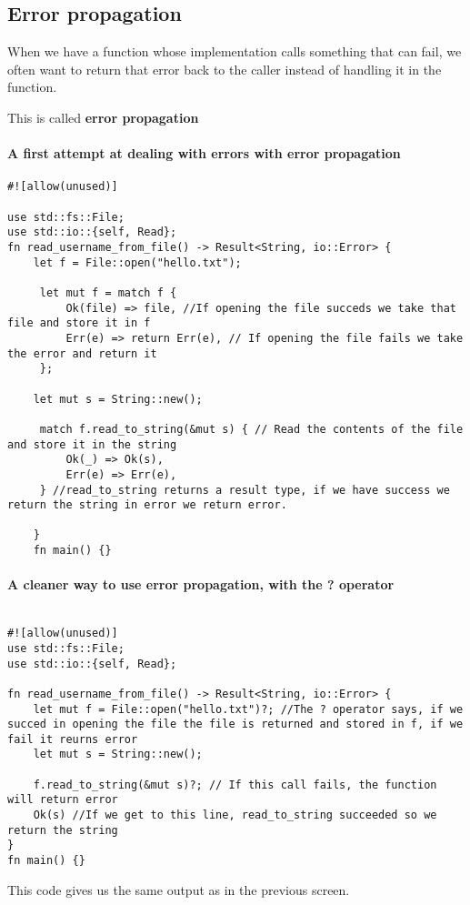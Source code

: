 \subsection{Error propagation}

\begin{definition}
    When we have a function whose implementation calls something that can fail, we often want to return that error back to the caller instead of handling it in the function.

    This is called \textbf{error propagation}        
\end{definition}
\newpage
\paragraph*{A first attempt at dealing with errors with error propagation}
\begin{lstlisting}   
#![allow(unused)]

use std::fs::File;
use std::io::{self, Read};
fn read_username_from_file() -> Result<String, io::Error> {
    let f = File::open("hello.txt");

     let mut f = match f {
         Ok(file) => file, //If opening the file succeds we take that file and store it in f
         Err(e) => return Err(e), // If opening the file fails we take the error and return it
     };

    let mut s = String::new(); 

     match f.read_to_string(&mut s) { // Read the contents of the file and store it in the string
         Ok(_) => Ok(s), 
         Err(e) => Err(e),
     } //read_to_string returns a result type, if we have success we return the string in error we return error.

    }
    fn main() {}
\end{lstlisting}

\paragraph*{A cleaner way to use error propagation, with the ? operator}
\begin{lstlisting}
    
#![allow(unused)]
use std::fs::File;
use std::io::{self, Read};

fn read_username_from_file() -> Result<String, io::Error> {
    let mut f = File::open("hello.txt")?; //The ? operator says, if we succed in opening the file the file is returned and stored in f, if we fail it reurns error
    let mut s = String::new(); 

    f.read_to_string(&mut s)?; // If this call fails, the function will return error
    Ok(s) //If we get to this line, read_to_string succeeded so we return the string
}
fn main() {}
\end{lstlisting}
This code gives us the same output as in the previous screen.


